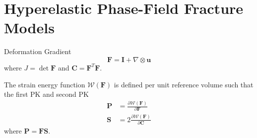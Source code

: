 \documentclass[12pt,3p]{article}
\numberwithin{equation}{section}
\begin{document}
\section{Hyperelastic Phase-Field Fracture Models}
Deformation Gradient 
\begin{equation}\label{EqDefGrad}
\mathbf{F}=\mathbf{I}+\nabla\otimes\bm{u}
\end{equation}
where $J=\det \mathbf{F}$ and $\mathbf{C}=\mathbf{F}^T\mathbf{F}$.

The strain energy function $\mathcal{W}(\mathbf{F})$ is defined per unit reference volume such that the first PK and second PK
\begin{subequations}\label{EqPK}
\begin{align}
\mathbf{P} &= \frac{\partial \mathcal{W}(\mathbf{F})}{\partial \mathbf{F}} \\
\mathbf{S} &= 2 \frac{\partial \mathcal{W}(\mathbf{F})}{\partial \mathbf{C}}
\end{align}
\end{subequations}
where $\mathbf{P}=\mathbf{F}\mathbf{S}$. 

\end{document}
